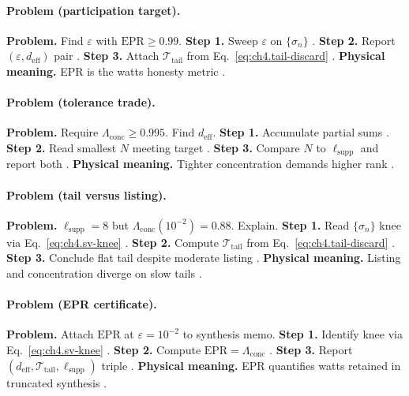 \paragraph{Problem (participation target).}
\textbf{Problem.} Find \(\varepsilon\) with \(\mathrm{EPR}\ge0.99\).
\textbf{Step 1.} Sweep \(\varepsilon\) on \(\{\sigma_{n}\}\) \cite{harrington2001}.
\textbf{Step 2.} Report \((\varepsilon,d_{\mathrm{eff}})\) pair \cite{hansen1988,devaney2004}.
\textbf{Step 3.} Attach \(\mathcal{T}_{\mathrm{tail}}\) from Eq.~\eqref{eq:ch4.tail-discard} \cite{stratton1941}.
\textbf{Physical meaning.} EPR is the watts honesty metric \cite{harrington2001}.

\paragraph{Problem (tolerance trade).}
\textbf{Problem.} Require \(\Lambda_{\mathrm{conc}}\ge0.995\). Find \(d_{\mathrm{eff}}\).
\textbf{Step 1.} Accumulate partial sums \cite{harrington2001}.
\textbf{Step 2.} Read smallest \(N\) meeting target \cite{hansen1988}.
\textbf{Step 3.} Compare \(N\) to \(\ell_{\mathrm{supp}}\) and report both \cite{stratton1941,devaney2004}.
\textbf{Physical meaning.} Tighter concentration demands higher rank \cite{hansen1988}.

\paragraph{Problem (tail versus listing).}
\textbf{Problem.} \(\ell_{\mathrm{supp}}=8\) but \(\Lambda_{\mathrm{conc}}(10^{-2})=0.88\). Explain.
\textbf{Step 1.} Read \(\{\sigma_{n}\}\) knee via Eq.~\eqref{eq:ch4.sv-knee} \cite{hansen1988}.
\textbf{Step 2.} Compute \(\mathcal{T}_{\mathrm{tail}}\) from Eq.~\eqref{eq:ch4.tail-discard} \cite{harrington2001}.
\textbf{Step 3.} Conclude flat tail despite moderate listing \cite{devaney2004,stratton1941}.
\textbf{Physical meaning.} Listing and concentration diverge on slow tails \cite{hansen1988}.

\paragraph{Problem (EPR certificate).}
\textbf{Problem.} Attach \(\mathrm{EPR}\) at \(\varepsilon=10^{-2}\) to synthesis memo.
\textbf{Step 1.} Identify knee via Eq.~\eqref{eq:ch4.sv-knee} \cite{hansen1988,harrington2001}.
\textbf{Step 2.} Compute \(\mathrm{EPR}=\Lambda_{\mathrm{conc}}\) \cite{harrington2001}.
\textbf{Step 3.} Report \((d_{\mathrm{eff}},\mathcal{T}_{\mathrm{tail}},\ell_{\mathrm{supp}})\) triple \cite{stratton1941,devaney2004}.
\textbf{Physical meaning.} EPR quantifies watts retained in truncated synthesis \cite{hansen1988}.

